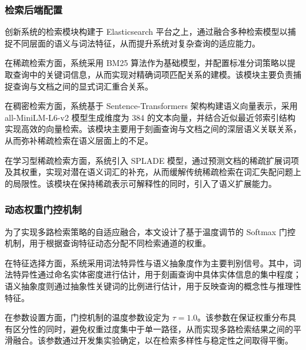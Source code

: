 \subsubsection*{检索后端配置}

创新系统的检索模块构建于 Elasticsearch 平台之上，通过融合多种检索模型以捕捉不同层面的语义与词法特征，从而提升系统对复杂查询的适应能力。

在稀疏检索方面，系统采用 BM25 算法作为基础模型，并配置标准分词策略以提取查询中的关键词信息，从而实现对精确词项匹配关系的建模。该模块主要负责捕捉查询与文档之间的显式词汇重合关系。

在稠密检索方面，系统基于 Sentence-Transformers 架构构建语义向量表示，采用 all-MiniLM-L6-v2 模型生成维度为 384 的文本向量，并结合近似最近邻索引结构实现高效的向量检索。该模块主要用于刻画查询与文档之间的深层语义关联关系，从而弥补稀疏检索在语义层面上的不足。

在学习型稀疏检索方面，系统引入 SPLADE 模型，通过预测文档的稀疏扩展词项及其权重，实现对潜在语义词汇的补充，从而缓解传统稀疏检索在词汇失配问题上的局限性。该模块在保持稀疏表示可解释性的同时，引入了语义扩展能力。


\subsubsection*{动态权重门控机制}

为了实现多路检索策略的自适应融合，本文设计了基于温度调节的 Softmax 门控机制，用于根据查询特征动态分配不同检索通道的权重。

在特征选择方面，系统采用词法特异性与语义抽象度作为主要判别信号。其中，词法特异性通过命名实体密度进行估计，用于刻画查询中具体实体信息的集中程度；语义抽象度则通过抽象性关键词的比例进行估计，用于反映查询的概念性与推理性特征。

在参数设置方面，门控机制的温度参数设定为 $\tau = 1.0$。该参数在保证权重分布具有区分性的同时，避免权重过度集中于单一路径，从而实现多路检索结果之间的平滑融合。该参数通过开发集实验确定，以在检索多样性与稳定性之间取得平衡。


